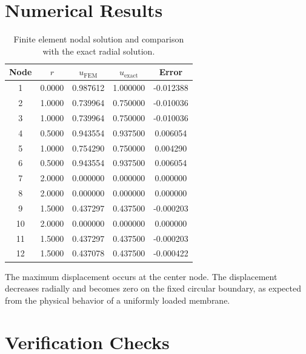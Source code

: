 \documentclass[12pt,a4paper]{article}
\begin{document}
\section{Numerical Results}

\begin{table}[H]
\centering
\caption{Finite element nodal solution and comparison with the exact radial solution.}
\label{tab:results}
\begin{tabular}{c c c c c}
\toprule
Node & $r$ & $u_{\text{FEM}}$ & $u_{\text{exact}}$ & Error \\
\midrule
1 & 0.0000 & 0.987612 & 1.000000 & -0.012388 \\
2 & 1.0000 & 0.739964 & 0.750000 & -0.010036 \\
3 & 1.0000 & 0.739964 & 0.750000 & -0.010036 \\
4 & 0.5000 & 0.943554 & 0.937500 & 0.006054 \\
5 & 1.0000 & 0.754290 & 0.750000 & 0.004290 \\
6 & 0.5000 & 0.943554 & 0.937500 & 0.006054 \\
7 & 2.0000 & 0.000000 & 0.000000 & 0.000000 \\
8 & 2.0000 & 0.000000 & 0.000000 & 0.000000 \\
9 & 1.5000 & 0.437297 & 0.437500 & -0.000203 \\
10 & 2.0000 & 0.000000 & 0.000000 & 0.000000 \\
11 & 1.5000 & 0.437297 & 0.437500 & -0.000203 \\
12 & 1.5000 & 0.437078 & 0.437500 & -0.000422 \\
\bottomrule
\end{tabular}
\end{table}

The maximum displacement occurs at the center node. The displacement decreases radially and becomes zero on the fixed circular boundary, as expected from the physical behavior of a uniformly loaded membrane.

\section{Verification Checks}
\end{document}
